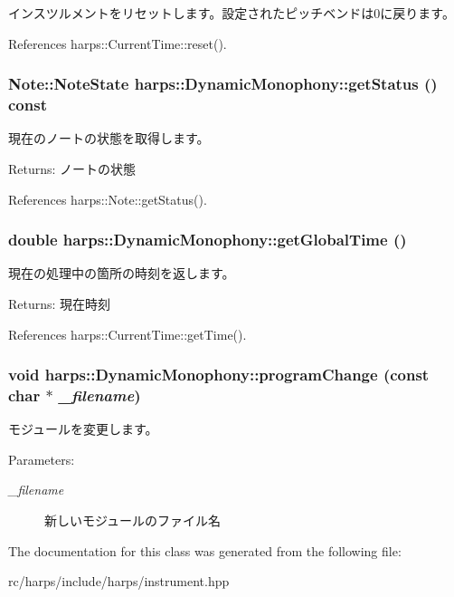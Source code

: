 インスツルメントをリセットします。設定されたピッチベンドは0に戻ります。 

References harps::CurrentTime::reset().
\subsubsection[getStatus]{\setlength{\rightskip}{0pt plus 5cm}Note::NoteState harps::DynamicMonophony::getStatus () const\hspace{0.3cm}{\tt  [inline]}}\label{classharps_1_1DynamicMonophony_7691d2caaed5a624a33541a6c89f62a1}


現在のノートの状態を取得します。 \begin{Desc}
\item[Returns:]ノートの状態 \end{Desc}


References harps::Note::getStatus().
\subsubsection[getGlobalTime]{\setlength{\rightskip}{0pt plus 5cm}double harps::DynamicMonophony::getGlobalTime ()\hspace{0.3cm}{\tt  [inline]}}\label{classharps_1_1DynamicMonophony_5891615a1418f7d7636469594c216f62}


現在の処理中の箇所の時刻を返します。 \begin{Desc}
\item[Returns:]現在時刻 \end{Desc}


References harps::CurrentTime::getTime().
\subsubsection[programChange]{\setlength{\rightskip}{0pt plus 5cm}void harps::DynamicMonophony::programChange (const char $\ast$ {\em \_\-filename})\hspace{0.3cm}{\tt  [inline]}}\label{classharps_1_1DynamicMonophony_1906e8848e676602585df3f896166dca}


モジュールを変更します。 \begin{Desc}
\item[Parameters:]
\begin{description}
\item[{\em \_\-filename}]新しいモジュールのファイル名 \end{description}
\end{Desc}


The documentation for this class was generated from the following file:\begin{CompactItemize}
\item 
rc/harps/include/harps/instrument.hpp\end{CompactItemize}
